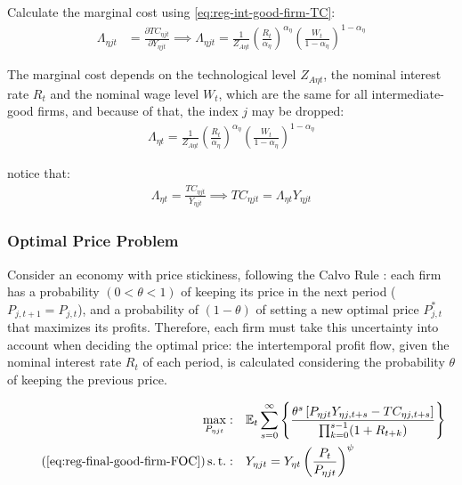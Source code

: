 \documentclass[
	thesis.tex
	]{subfiles}
\begin{document}

Calculate the marginal cost using \ref{eq:reg-int-good-firm-TC}: 
\begin{align}
	\Lambda_{\eta jt} & = \frac{\partial TC_{\eta jt}}{\partial Y_{\eta jt}} \implies 
	\Lambda_{\eta jt} = \frac{1}{Z_{A\eta t}} \left( \frac{R_t}{{\alpha_\eta}} \right)^{{\alpha_\eta}} \left( \frac{W_t}{1-{\alpha_\eta}} \right)^{1-{\alpha_\eta}} \label{eq:reg-int-good-firm-MC}
\end{align}

The marginal cost depends on the technological level $Z_{A\eta t}$, the nominal interest rate $R_t$ and the nominal wage level $W_t$, which are the same for all intermediate-good firms, and because of that, the index $j$ may be dropped:
\begin{align}
	\label{eq:reg-int-good-firm-MC-2}
	\Lambda_{\eta t} = \frac{1}{Z_{A\eta t}} \left( \frac{R_t}{{\alpha_\eta}} \right)^{{\alpha_\eta}} \left( \frac{W_t}{1-{\alpha_\eta}} \right)^{1-{\alpha_\eta}}
\end{align}

notice that:
\begin{align}
	\label{eq:reg-int-good-firm-TC-MC}
	\Lambda_{\eta t} = \frac{TC_{\eta jt}}{Y_{\eta jt}} \implies 
	TC_{\eta jt} = \Lambda_{\eta t} Y_{\eta jt}
\end{align}


\subsubsection*{Optimal Price Problem}

Consider an economy with price stickiness, following the Calvo Rule \cite{calvo_staggered_1983}: each firm has a probability $(0 < \theta < 1)$ of keeping its price in the next period ($P_{j,t+1} = P_{j,t}$), and a probability of $(1 - \theta)$ of setting a new optimal price $P_{j,t}^\ast$ that maximizes its profits. Therefore, each firm must take this uncertainty into account when deciding the optimal price: the intertemporal profit flow, given the nominal interest rate $R_t$ of each period, is calculated considering the probability $\theta$ of keeping the previous price.

\begin{align}
	\label{eq:reg-int-good-firm-optimal-price-problem}
	\max_{P_{\eta jt}}: & \quad \E \sum_{s=0}^{\infty} \left\{ \frac{ \theta^s \left[ P_{\eta jt} Y_{\eta j,t+s} - TC_{\eta j,t+s} \right] }{\prod_{k=0}^{s-1}(1+R_{t+k})} \right\} \\
	\tag{\ref{eq:reg-final-good-firm-FOC}}
	\st: & \quad Y_{\eta jt} = Y_{\eta t} \left( \frac{P_t}{P_{\eta jt}} \right)^{\psi}
\end{align}
\end{document}
